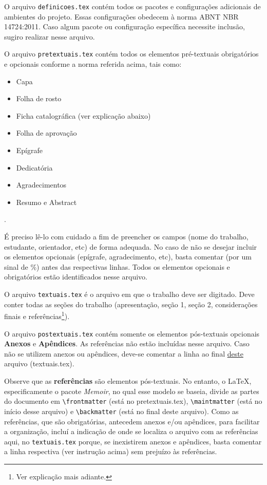 \documentclass[a4paper,12pt,oneside,openright,extrafontsizes,openbib]{memoir}
\begin{document}
{O arquivo \verb|definicoes.tex| contém todos os pacotes e configurações adicionais de ambientes do projeto. Essas configurações obedecem à norma ABNT NBR 14724:2011. Caso algum pacote ou configuração específica necessite inclusão, sugiro realizar nesse arquivo.

O arquivo \verb|pretextuais.tex| contém todos os elementos pré-textuais obrigatórios e opcionais conforme a norma referida acima, tais como:

\begin{itemize}
	\item Capa
	\item Folha de rosto
	\item Ficha catalográfica (ver explicação abaixo)
	\item Folha de aprovação
	\item Epígrafe
	\item Dedicatória
	\item Agradecimentos
	\item Resumo e Abstract
\end{itemize}. 

É preciso lê-lo com cuidado a fim de preencher os campos (nome do trabalho, estudante, orientador, etc) de forma adequada. No caso de não se desejar incluir os elementos opcionais (epígrafe, agradecimento, etc), basta comentar (por um sinal de \%) antes das respectivas linhas. Todos os elementos opcionais e obrigatórios estão identificados nesse arquivo.

O arquivo \verb|textuais.tex| é o arquivo em que o trabalho deve ser digitado. Deve conter todas as seções do trabalho (apresentação, seção 1, seção 2, considerações finais e referências\footnote{Ver explicação mais adiante.}).

O arquivo \verb|postextuais.tex| contém somente os elementos pós-textuais opcionais \textbf{Anexos} e \textbf{Apêndices}. As referências não estão incluídas nesse arquivo. Caso não se utilizem anexos ou apêndices, deve-se comentar a linha \verb|| ao final \underline{deste} arquivo (textuais.tex).

Observe que as \textbf{referências} são elementos pós-textuais. No entanto, o \LaTeX, especificamente o pacote \textit{Memoir}, no qual esse modelo se baseia, divide as partes do documento em \verb|\frontmatter| (está no pretextuais.tex), \verb|\maintmatter| (está no início desse arquivo) e \verb|\backmatter| (está no final deste arquivo). Como as referências, que são obrigatórias, antecedem anexos e/ou apêndices, para facilitar a organização, incluí a indicação de onde se localiza o arquivo com as referências aqui, no \verb|textuais.tex| porque, se inexistirem anexos e apêndices, basta comentar a linha respectiva (ver instrução acima) sem prejuízo às referências.

}
\end{document}
